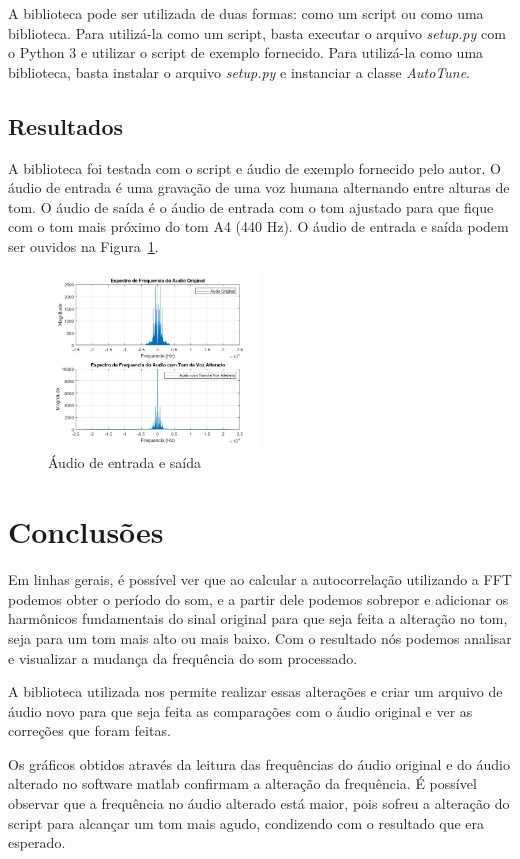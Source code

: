\documentclass{sbrt}
\begin{document}
A biblioteca pode ser utilizada de duas formas: como um script ou como uma biblioteca. Para utilizá-la como um script,
basta executar o arquivo \textit{setup.py} com o Python 3 e utilizar o script de exemplo fornecido. Para utilizá-la como
uma biblioteca, basta instalar o arquivo \textit{setup.py} e instanciar a classe \textit{AutoTune}.

\subsection{Resultados}

A biblioteca foi testada com o script e áudio de exemplo fornecido pelo autor. O áudio de entrada é uma gravação de uma
voz humana alternando entre alturas de tom. O áudio de saída é o áudio de entrada com o tom ajustado para que fique com
o tom mais próximo do tom A4 (440 Hz). O áudio de entrada e saída podem ser ouvidos na Figura~\ref{fig:resultado}.

\begin{figure}[h]
  \centering
  \includegraphics[width=0.5\textwidth]{resultado.jpg}
  \caption{Áudio de entrada e saída}
  \label{fig:resultado}
\end{figure}


\section{Conclusões}

Em linhas gerais, é possível ver que ao calcular a autocorrelação utilizando a FFT podemos obter o período do som, e a
partir dele podemos sobrepor e adicionar os harmônicos fundamentais do sinal original para que seja feita a alteração no
tom, seja para um tom mais alto ou mais baixo. Com o resultado nós podemos analisar e visualizar a mudança da frequência
do som processado.

A biblioteca utilizada nos permite realizar essas alterações e criar um arquivo de áudio novo para que seja feita as
comparações com o áudio original e ver as correções que foram feitas. 

Os gráficos obtidos através da leitura das frequências do áudio original e do áudio alterado no software matlab
confirmam a alteração da frequência. É possível observar que a frequência no áudio alterado está maior, pois sofreu a
alteração do script para alcançar um tom mais agudo, condizendo com o resultado que era esperado. 





\end{document}
